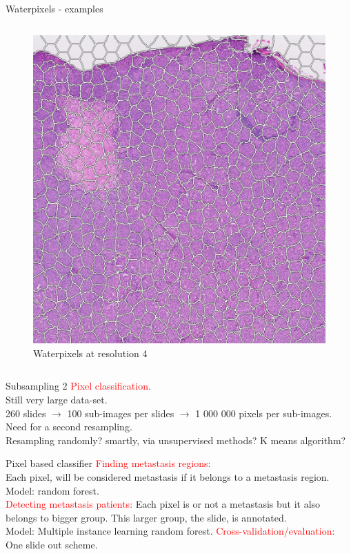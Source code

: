\documentclass{beamer}
\begin{document}
\begin{frame}{Waterpixels - examples}
\begin{columns}[T]
\begin{column}{.3\textwidth}
\begin{figure}[!ht]
\centering
\includegraphics[width=\textwidth]{waterpix_res4.png}
\caption{Waterpixels at resolution 4}
\label{}
\end{figure}
\end{column}%

\end{columns}
\end{frame}

\begin{frame}{Subsampling 2}
\textcolor{red}{Pixel classification}. \\
Still very large data-set. \\
260 slides $\rightarrow$ 100 sub-images per slides $\rightarrow$ 1 000 000 pixels per sub-images. \\
Need for a second resampling. \\
Resampling randomly? smartly, via unsupervised methods? K means algorithm? 
\end{frame}

\begin{frame}{Pixel based classifier}
\textcolor{red}{Finding metastasis regions:}\\
Each pixel, will be considered metastasis if it belongs to a metastasis region. \\
Model: random forest. \\
\textcolor{red}{Detecting metastasis patients:}
Each pixel is or not a metastasis but it also belongs to bigger group. This larger group, the slide, is annotated. \\
Model: Multiple instance learning random forest.
\textcolor{red}{Cross-validation/evaluation:} \\
One slide out scheme.
\end{frame}
\end{document}
